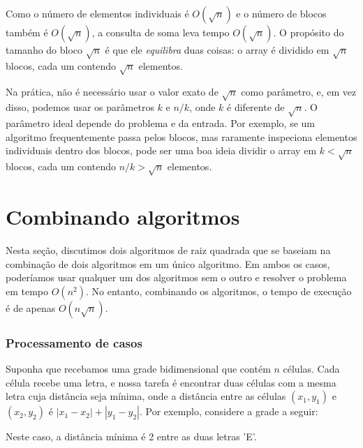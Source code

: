 Como o número de elementos individuais é $O(\sqrt n)$
e o número de blocos também é $O(\sqrt n)$,
a consulta de soma leva tempo $O(\sqrt n)$.
O propósito do tamanho do bloco $\sqrt n$ é
que ele \emph{equilibra} duas coisas:
o array é dividido em $\sqrt n$ blocos,
cada um contendo $\sqrt n$ elementos.

Na prática, não é necessário usar o
valor exato de $\sqrt n$ como parâmetro,
e, em vez disso, podemos usar os parâmetros $k$ e $n/k$, onde $k$ é
diferente de $\sqrt n$.
O parâmetro ideal depende do problema e da entrada.
Por exemplo, se um algoritmo frequentemente passa
pelos blocos, mas raramente inspeciona
elementos individuais dentro dos blocos,
pode ser uma boa ideia dividir o array em
$k < \sqrt n$ blocos, cada um contendo $n/k > \sqrt n$
elementos.

\section{Combinando algoritmos}

Nesta seção, discutimos dois algoritmos de raiz quadrada
que se baseiam na combinação de dois algoritmos em um único algoritmo.
Em ambos os casos, poderíamos usar qualquer um dos algoritmos
sem o outro
e resolver o problema em tempo $O(n^2)$.
No entanto, combinando os algoritmos, o tempo de execução é de apenas $O(n \sqrt n)$.

\subsubsection{Processamento de casos}

Suponha que recebamos uma grade bidimensional
que contém $n$ células.
Cada célula recebe uma letra,
e nossa tarefa é encontrar duas células
com a mesma letra cuja distância seja mínima,
onde a distância entre as células
$(x_1,y_1)$ e $(x_2,y_2)$ é $|x_1-x_2|+|y_1-y_2|$.
Por exemplo, considere a grade a seguir:

\begin{center}
\end{center}
Neste caso, a distância mínima é 2 entre as duas letras 'E'.

